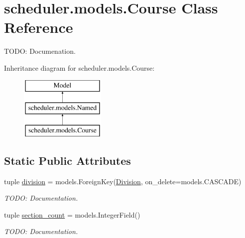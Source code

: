 \hypertarget{classscheduler_1_1models_1_1_course}{\section{scheduler.\-models.\-Course Class Reference}
\label{classscheduler_1_1models_1_1_course}
}


T\-O\-D\-O\-: Documenation.  


Inheritance diagram for scheduler.\-models.\-Course\-:\begin{figure}[H]
\begin{center}
\leavevmode
\includegraphics[height=3.000000cm]{classscheduler_1_1models_1_1_course}
\end{center}
\end{figure}
\subsection*{Static Public Attributes}
\begin{DoxyCompactItemize}
\item 
\hypertarget{classscheduler_1_1models_1_1_course_a469fbc25ba99da1185556bcd2d46f1b0}{tuple \hyperlink{classscheduler_1_1models_1_1_course_a469fbc25ba99da1185556bcd2d46f1b0}{division} = models.\-Foreign\-Key(\hyperlink{classscheduler_1_1models_1_1_division}{Division}, on\-\_\-delete=models.\-C\-A\-S\-C\-A\-D\-E)}\label{classscheduler_1_1models_1_1_course_a469fbc25ba99da1185556bcd2d46f1b0}

\begin{DoxyCompactList}\small\item\em T\-O\-D\-O\-: Documentation. \end{DoxyCompactList}\item 
\hypertarget{classscheduler_1_1models_1_1_course_a954dad31e8fd543a5158eb145e76837f}{tuple \hyperlink{classscheduler_1_1models_1_1_course_a954dad31e8fd543a5158eb145e76837f}{section\-\_\-count} = models.\-Integer\-Field()}\label{classscheduler_1_1models_1_1_course_a954dad31e8fd543a5158eb145e76837f}

\begin{DoxyCompactList}\small\item\em T\-O\-D\-O\-: Documentation. \end{DoxyCompactList}\end{DoxyCompactItemize}
